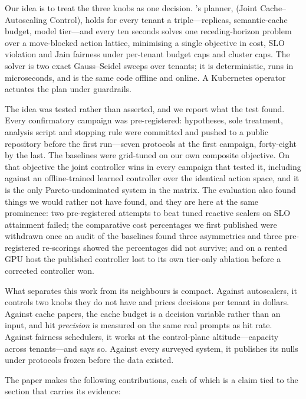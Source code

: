Our idea is to treat the three knobs as one decision. \polyforge{}'s
planner, \jcac{} (Joint Cache--Autoscaling Control), holds for every tenant
a triple---replicas, semantic-cache budget, model tier---and every ten
seconds solves one receding-horizon problem over a move-blocked action
lattice, minimising a single objective in cost, SLO violation and Jain
fairness under per-tenant budget caps and cluster caps. The solver is two
exact Gauss--Seidel sweeps over tenants; it is deterministic, runs in
microseconds, and is the same code offline and online. A Kubernetes
operator actuates the plan under guardrails.

The idea was tested rather than asserted, and we report what the test
found. Every confirmatory campaign was pre-registered: hypotheses, sole
treatment, analysis script and stopping rule were committed and pushed to a
public repository before the first run---seven protocols at the first
campaign, forty-eight by the last. The baselines were grid-tuned on our own
composite objective. On that objective the joint controller wins in every
campaign that tested it, including against an offline-trained learned
controller over the identical action space, and it is the only
Pareto-undominated system in the matrix. The evaluation also found things
we would rather not have found, and they are here at the same prominence:
two pre-registered attempts to beat tuned reactive scalers on SLO
attainment failed; the comparative cost percentages we first published were
withdrawn once an audit of the baselines found three asymmetries and three
pre-registered re-scorings showed the percentages did not survive; and on a
rented GPU host the published controller lost to its own tier-only
ablation before a corrected controller won.

What separates this work from its neighbours is compact. Against
autoscalers, it controls two knobs they do not have and prices decisions
per tenant in dollars. Against cache papers, the cache budget is a decision
variable rather than an input, and hit \emph{precision} is measured on the
same real prompts as hit rate. Against fairness schedulers, it works at the
control-plane altitude---capacity across tenants---and says so. Against
every surveyed system, it publishes its nulls under protocols frozen before
the data existed.

The paper makes the following contributions, each of which is a claim tied
to the section that carries its evidence:

